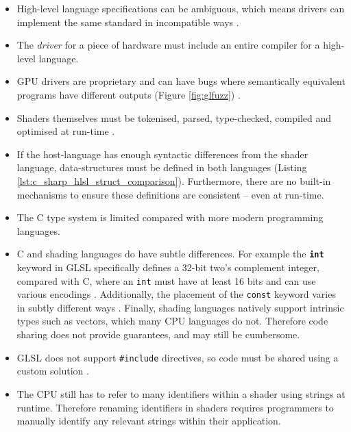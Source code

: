 \documentclass[a4paper,12pt,twoside,openright]{report}
\begin{document}
\begin{itemize}

    \item High-level language specifications can be ambiguous, which means
    drivers can implement the same standard in incompatible ways
    \cite{NVIDIAInternshipLessons}.

    \item The \textit{driver} for a piece of hardware must include an entire
    compiler for a high-level language.

    \item GPU drivers are proprietary and can have bugs where semantically
    equivalent programs have different outputs (Figure \ref{fig:glfuzz})
    \cite{GLFuzz}.

    \item Shaders themselves must be tokenised, parsed, type-checked, compiled
    and optimised at run-time \cite{TripThroughGraphicsPipeline1}.

    \item If the host-language has enough syntactic differences from the shader
    language, data-structures must be defined in both languages (Listing
    \ref{lst:c_sharp_hlsl_struct_comparison}). Furthermore, there are no
    built-in mechanisms to ensure these definitions are consistent -- even at
    run-time.

    \item The C type system is limited compared with more modern programming
    languages.

    \item C and shading languages do have subtle differences. For example the
    \textbf{\texttt{int}} keyword in GLSL specifically defines a 32-bit two's
    complement integer, compared with C, where an \texttt{int} must have at
    least 16 bits and can use various encodings \cite{FundementalTypes}.
    Additionally, the placement of the \texttt{const} keyword varies in subtly
    different ways \cite{FundementalTypesGLSL}. Finally, shading languages
    natively support intrinsic types such as vectors, which many CPU languages
    do not. Therefore code sharing does not provide guarantees, and may still
    be cumbersome.

    \item GLSL does not support \texttt{\#include} directives, so code must be
    shared using a custom solution \cite{NoIncludeGLSL}.

    \item The CPU still has to refer to many identifiers within a shader using
    strings at runtime. Therefore renaming identifiers in shaders requires
    programmers to manually identify any relevant strings within their
    application.

\end{itemize}
\end{document}
